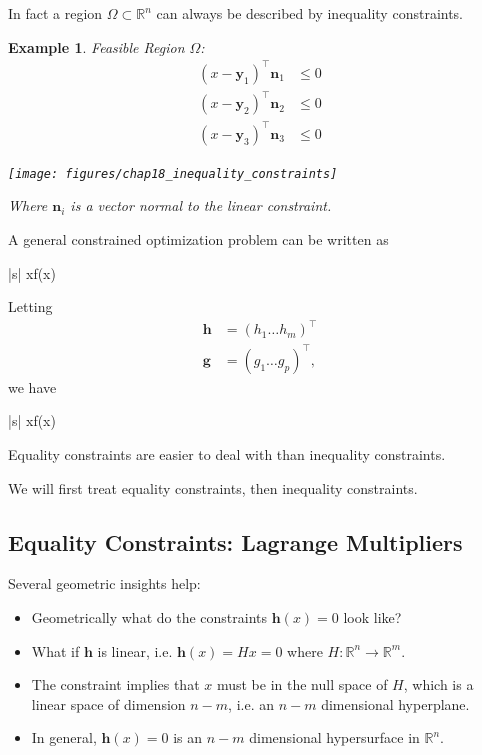 \documentclass{article}
\newtheorem{example}[theorem]{Example}
\newcommand{\gbf}{\mathbf{g}}
\newcommand{\hbf}{\mathbf{h}}
\newcommand{\nbf}{\mathbf{n}}
\newcommand{\ybf}{\mathbf{y}}
\begin{document}
	In fact a region $\Omega \subset \mathbb{R}^n$ can always be described by inequality constraints.

		
	\begin{example}
				Feasible Region $\Omega$:
				\begin{align*}
					(x-\ybf_1)^\top \nbf_1 &\leq 0	\\
					(x-\ybf_2)^\top \nbf_2 &\leq 0	\\
					(x-\ybf_3)^\top \nbf_3 &\leq 0
				\end{align*}


				\begin{center}
					\texttt{[image: figures/chap18\_inequality\_constraints]}
				\end{center}

		Where $\nbf_i$ is a vector normal to the linear constraint.	
	\end{example}

	A general constrained optimization problem can be written as
	\begin{mini*}|s|
		{x\in\Omega}{f(x)}{}{}
		\addConstraint{\vdots}
		\addConstraint{\vdots}
	\end{mini*}

	Letting 
		\begin{align*}
			\hbf &= (h_1 \ldots h_m)^\top \\
			\gbf &= (g_1 \ldots g_p)^\top,		
		\end{align*}
 	we have
	\begin{mini*}|s|
		{x\in\Omega}{f(x)}{}{}
		\addConstraint{\hbf(x)=0}
		\addConstraint{\gbf(x)\leq 0}		
	\end{mini*} 	
	
	Equality constraints are easier to deal with than inequality constraints.
		
	We will first treat equality constraints, then inequality constraints.
	
\subsection{Equality Constraints: Lagrange Multipliers}

	Several geometric insights help:
	
\par{} 
	\begin{itemize}
		\item Geometrically what do the constraints $\hbf(x) = 0$ look like?
		\item What if $\hbf$ is linear, i.e. $\hbf(x) = Hx = 0$ where $H:\mathbb{R}^n\to\mathbb{R}^m$.
		\item The constraint implies that $x$ must be in the null space of $H$, which is a linear space of dimension $n-m$, i.e. an $n-m$ dimensional hyperplane.
		\item In general, $\hbf(x)=0$ is an $n-m$ dimensional hypersurface in $\mathbb{R}^n$.
	\end{itemize}
\end{document}
